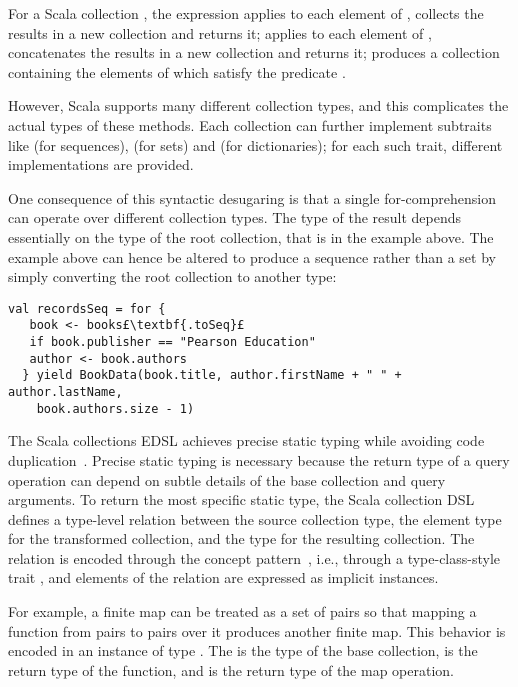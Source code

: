 For a Scala collection , the expression  applies  to each element of , collects the results in a new collection and returns it;  applies  to each element of , concatenates the results in a new collection and returns it;  produces a collection containing the elements of  which satisfy the predicate .

However, Scala supports many different collection types, and this complicates the actual types of these methods. Each collection can further implement subtraits like  (for sequences),  (for sets) and  (for dictionaries); for each such trait, different implementations are provided.

One consequence of this syntactic desugaring is that a single for-comprehension can operate over different collection types.
The type of the result depends essentially on the type of the root collection, that is  in the example above. The example above can hence be altered to produce a sequence rather than a set by simply converting the root collection to another type:
\begin{lstlisting}
val recordsSeq = for {
   book <- books£\textbf{.toSeq}£
   if book.publisher == "Pearson Education"
   author <- book.authors
  } yield BookData(book.title, author.firstName + " " + author.lastName,
    book.authors.size - 1)
\end{lstlisting}

The Scala collections EDSL achieves precise static typing while avoiding code duplication~\citep{odersky2009fighting}. Precise static typing is necessary because the return type of a query operation can depend on subtle details of the base collection and query arguments. 
To return the most specific static type, the Scala collection DSL defines a type-level relation between the source collection type, the element type for the transformed collection, and the type for the resulting collection. The relation is encoded through the concept pattern~\citep{Oliveira10TCOI}, i.e., through a type-class-style trait , and elements of the relation are expressed as implicit instances.

For example, a finite map can be treated as a set of pairs so that mapping a function from pairs to pairs over it produces another finite map. This behavior is encoded in an instance of type \code{CanBuildFrom[Map[K, V], (K1, V1), Map[K1, V1]}. The  is the type of the base collection,  is the return type of the function, and  is the return type of the map operation.

